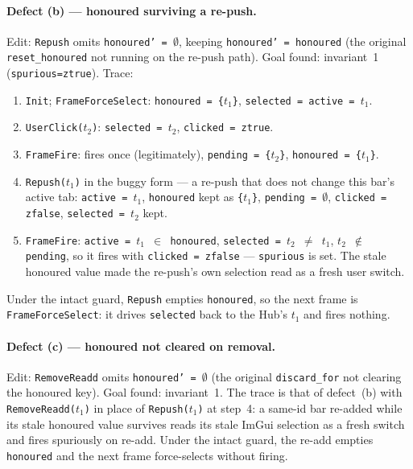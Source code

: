 \documentclass[a4paper,10pt,fleqn]{article}
\begin{document}
\paragraph{Defect (b) --- honoured surviving a re-push.}
Edit: \texttt{Repush} omits \texttt{honoured' = $\emptyset$}, keeping
\texttt{honoured' = honoured} (the original \texttt{reset\_honoured} not
running on the re-push path).  Goal found: invariant~1
(\texttt{spurious=ztrue}).  Trace:
\begin{enumerate}
  \item \texttt{Init}; \texttt{FrameForceSelect}: \texttt{honoured = \{$t_1$\}},
    \texttt{selected = active = $t_1$}.
  \item \texttt{UserClick($t_2$)}: \texttt{selected = $t_2$},
    \texttt{clicked = ztrue}.
  \item \texttt{FrameFire}: fires once (legitimately), \texttt{pending =
    \{$t_2$\}}, \texttt{honoured = \{$t_1$\}}.
  \item \texttt{Repush($t_1$)} in the buggy form --- a re-push that does not
    change this bar's active tab: \texttt{active = $t_1$}, \texttt{honoured}
    kept as \texttt{\{$t_1$\}}, \texttt{pending = $\emptyset$},
    \texttt{clicked = zfalse}, \texttt{selected = $t_2$} kept.
  \item \texttt{FrameFire}: \texttt{active = $t_1$ $\in$ honoured},
    \texttt{selected = $t_2$ $\neq$ $t_1$}, \texttt{$t_2$ $\notin$ pending}, so
    it fires with \texttt{clicked = zfalse} --- \texttt{spurious} is set.  The
    stale honoured value made the re-push's own selection read as a fresh user
    switch.
\end{enumerate}
Under the intact guard, \texttt{Repush} empties \texttt{honoured}, so the next
frame is \texttt{FrameForceSelect}: it drives \texttt{selected} back to the
Hub's $t_1$ and fires nothing.

\paragraph{Defect (c) --- honoured not cleared on removal.}
Edit: \texttt{RemoveReadd} omits \texttt{honoured' = $\emptyset$} (the original
\texttt{discard\_for} not clearing the honoured key).  Goal found:
invariant~1.  The trace is that of defect~(b) with \texttt{RemoveReadd($t_1$)}
in place of \texttt{Repush($t_1$)} at step~4: a same-id bar re-added while its
stale honoured value survives reads its stale ImGui selection as a fresh switch
and fires spuriously on re-add.  Under the intact guard, the re-add empties
\texttt{honoured} and the next frame force-selects without firing.
\end{document}
